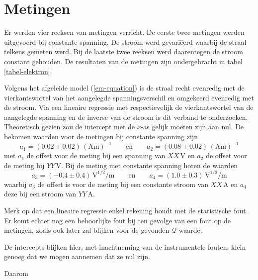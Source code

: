 \section{Metingen}


Er werden vier reeksen van metingen verricht. De eerste twee metingen 
werden uitgevoerd bij constante spanning. De stroom werd gevari\"eerd 
waarbij de straal telkens gemeten werd. Bij de laatste twee reeksen werd 
daarentegen de stroom constant gehouden. De resultaten van de metingen zijn 
ondergebracht in tabel \ref{tabel-elektron}.

Volgens het afgeleide model (\ref{em-equation}) is de straal recht 
evenredig met de vierkantswortel van het aangelegde spanningsverschil en 
omgekeerd evenredig met de stroom. Via een lineaire regressie met 
respectievelijk de vierkantswortel van de aangelegde spanning en de inverse 
van de stroom is dit verband te onderzoeken. Theoretisch gezien zou de 
intercept met de $x$-as gelijk moeten zijn aan nul.  De bekomen waarden 
voor de metingen bij constante spanning zijn
$$
a_1 = (0.02 \pm 0.02)\,(\textrm{Am})^{-1}
\qquad \textrm{en} \qquad
a_2 = (0.08 \pm 0.02)\,(\textrm{Am})^{-1}
$$
met $a_1$ de offset voor de meting bij een spanning van $XX$\,V en $a_2$ de 
offset voor de meting bij $YY$\,V. Bij de meting met constante spanning 
horen de waarden
$$
a_3 = (-0.4 \pm 0.4)\,\textrm{V}^{1/2}\textrm{/m}
\qquad \textrm{en} \qquad
a_4 = (1.0 \pm 0.3)\,\textrm{V}^{1/2}\textrm{/m}
$$
waarbij $a_3$ de offset is voor de meting bij een constante stroom van 
$XX$\,A en $a_4$ deze bij een stroom van $YY$\,A.




Merk op dat een lineaire regressie enkel rekening houdt met de statistische 
fout. Er komt echter nog een behoorlijke fout bij ten gevolge van een fout 
op de metingen, zoals ook later zal blijken voor de gevonden 
$\mathcal{Q}$-waarde.

De intercepts blijken hier, met inachtneming van de instrumentele fouten, 
klein genoeg dat we mogen aannemen dat ze nul zijn.

Daarom
